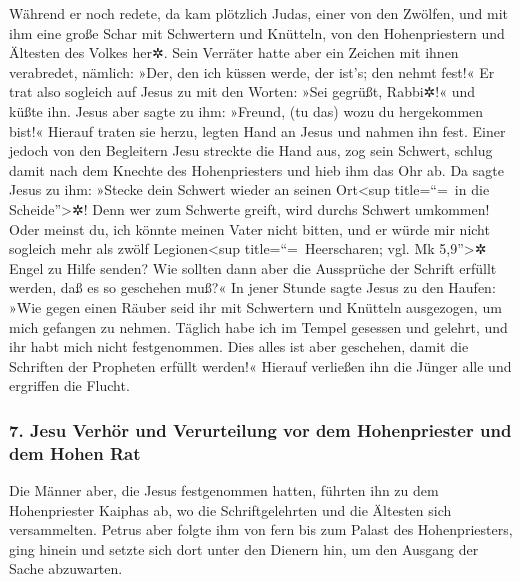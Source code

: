  Während er noch redete, da kam plötzlich Judas, einer
von den Zwölfen, und mit ihm eine große Schar mit Schwertern und
Knütteln, von den Hohenpriestern und Ältesten des Volkes her✲.
 Sein Verräter hatte aber ein Zeichen mit ihnen
verabredet, nämlich: »Der, den ich küssen werde, der ist's; den nehmt
fest!«  Er trat also sogleich auf Jesus zu mit den
Worten: »Sei gegrüßt, Rabbi✲!« und küßte ihn.  Jesus aber
sagte zu ihm: »Freund, (tu das) wozu du hergekommen bist!« Hierauf
traten sie herzu, legten Hand an Jesus und nahmen ihn fest.
 Einer jedoch von den Begleitern Jesu streckte die Hand
aus, zog sein Schwert, schlug damit nach dem Knechte des Hohenpriesters
und hieb ihm das Ohr ab.  Da sagte Jesus zu ihm: »Stecke
dein Schwert wieder an seinen Ort\textless sup title=``=~in die
Scheide''\textgreater✲! Denn wer zum Schwerte greift, wird durchs
Schwert umkommen!  Oder meinst du, ich könnte meinen
Vater nicht bitten, und er würde mir nicht sogleich mehr als zwölf
Legionen\textless sup title=``=~Heerscharen; vgl. Mk 5,9''\textgreater✲
Engel zu Hilfe senden?  Wie sollten dann aber die
Aussprüche der Schrift erfüllt werden, daß es so geschehen muß?«
 In jener Stunde sagte Jesus zu den Haufen: »Wie gegen
einen Räuber seid ihr mit Schwertern und Knütteln ausgezogen, um mich
gefangen zu nehmen. Täglich habe ich im Tempel gesessen und gelehrt, und
ihr habt mich nicht festgenommen.  Dies alles ist aber
geschehen, damit die Schriften der Propheten erfüllt werden!« Hierauf
verließen ihn die Jünger alle und ergriffen die Flucht.

\hypertarget{jesu-verhuxf6r-und-verurteilung-vor-dem-hohenpriester-und-dem-hohen-rat}{%
\subsubsection{7. Jesu Verhör und Verurteilung vor dem Hohenpriester und
dem Hohen
Rat}\label{jesu-verhuxf6r-und-verurteilung-vor-dem-hohenpriester-und-dem-hohen-rat}}

 Die Männer aber, die Jesus festgenommen hatten, führten
ihn zu dem Hohenpriester Kaiphas ab, wo die Schriftgelehrten und die
Ältesten sich versammelten.  Petrus aber folgte ihm von
fern bis zum Palast des Hohenpriesters, ging hinein und setzte sich dort
unter den Dienern hin, um den Ausgang der Sache abzuwarten.

